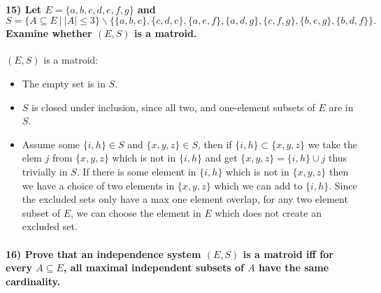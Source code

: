 \documentclass[
]{article}
\providecommand{\tightlist}{%
  \setlength{\itemsep}{0pt}\setlength{\parskip}{0pt}}
\begin{document}
\hypertarget{let-e-abcdefg-and-s-a-subseteq-e-a-leq-3-backslash-abc-cde-aef-adg-cfg-beg-bdf.-examine-whether-es-is-a-matroid.}{%
\paragraph{\texorpdfstring{15) Let \(E = \{a,b,c,d,e,f,g\}\) and
\[S = \{A \subseteq E \ | \ |A| \leq 3 \} \backslash \{\{a,b,c\}, \{c,d,e\}, \{a,e,f\}, \{a,d,g\}, \{c,f,g\}, \{b,e,g\}, \{b,d,f\}\}.\]
Examine whether \((E,S)\) is a
matroid.}{15) Let E = \textbackslash\{a,b,c,d,e,f,g\textbackslash\} and S = \textbackslash\{A \textbackslash subseteq E \textbackslash{} \textbar{} \textbackslash{} \textbar A\textbar{} \textbackslash leq 3 \textbackslash\} \textbackslash backslash \textbackslash\{\textbackslash\{a,b,c\textbackslash\}, \textbackslash\{c,d,e\textbackslash\}, \textbackslash\{a,e,f\textbackslash\}, \textbackslash\{a,d,g\textbackslash\}, \textbackslash\{c,f,g\textbackslash\}, \textbackslash\{b,e,g\textbackslash\}, \textbackslash\{b,d,f\textbackslash\}\textbackslash\}. Examine whether (E,S) is a matroid.}}\label{let-e-abcdefg-and-s-a-subseteq-e-a-leq-3-backslash-abc-cde-aef-adg-cfg-beg-bdf.-examine-whether-es-is-a-matroid.}}

\((E,S)\) is a matroid:

\begin{itemize}
\tightlist
\item
  The empty set is in \(S\).
\item
  \(S\) is closed under inclusion, since all two, and one-element
  subsets of \(E\) are in \(S\).
\item
  Assume some \(\{i,h\} \in S\) and \(\{x,y,z\} \in S\), then if
  \(\{i,h\} \subset \{x,y,z\}\) we take the elem \(j\) from
  \(\{x,y,z\}\) which is not in \(\{i,h\}\) and get
  \(\{x,y,z\} = \{i,h\} \cup j\) thus trivially in \(S\). If there is
  some element in \(\{i,h\}\) which is not in \(\{x,y,z\}\) then we have
  a choice of two elements in \(\{x,y,z\}\) which we can add to
  \(\{i,h\}\). Since the excluded sets only have a max one element
  overlap, for any two element subset of \(E\), we can choose the
  element in \(E\) which does not create an excluded set.
\end{itemize}

\hypertarget{prove-that-an-independence-system-es-is-a-matroid-iff-for-every-a-subseteq-e-all-maximal-independent-subsets-of-a-have-the-same-cardinality.}{%
\paragraph{\texorpdfstring{16) Prove that an independence system
\((E,S)\) is a matroid iff for every \(A \subseteq E\), all maximal
independent subsets of \(A\) have the same
cardinality.}{16) Prove that an independence system (E,S) is a matroid iff for every A \textbackslash subseteq E, all maximal independent subsets of A have the same cardinality.}}\label{prove-that-an-independence-system-es-is-a-matroid-iff-for-every-a-subseteq-e-all-maximal-independent-subsets-of-a-have-the-same-cardinality.}}
\end{document}
